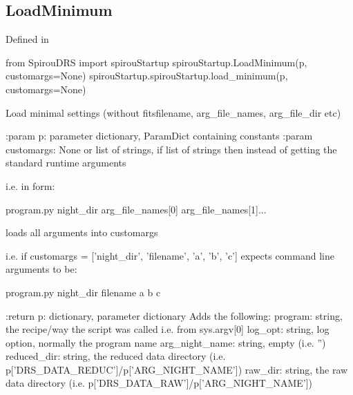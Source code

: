 \noindent\begin{minipage}{\textwidth}
\subsection{LoadMinimum}

Defined in \spirouStartup{}

\begin{pythonbox}
from SpirouDRS import spirouStartup
spirouStartup.LoadMinimum(p, customargs=None)
spirouStartup.spirouStartup.load_minimum(p, customargs=None)
\end{pythonbox}

\begin{pythondocstring}
Load minimal settings (without fitsfilename, arg_file_names, arg_file_dir
etc)

:param p: parameter dictionary, ParamDict containing constants
:param customargs: None or list of strings, if list of strings then instead
                   of getting the standard runtime arguments

       i.e. in form:

            program.py night_dir arg_file_names[0] arg_file_names[1]...

       loads all arguments into customargs

       i.e. if customargs = ['night_dir', 'filename', 'a', 'b', 'c']
       expects command line arguments to be:

            program.py night_dir filename a b c

:return p: dictionary, parameter dictionary
        Adds the following:
            program: string, the recipe/way the script was called
                     i.e. from sys.argv[0]
            log_opt: string, log option, normally the program name
            arg_night_name: string, empty (i.e. '')
            reduced_dir: string, the reduced data directory
                         (i.e. p['DRS_DATA_REDUC']/p['ARG_NIGHT_NAME'])
            raw_dir: string, the raw data directory
                     (i.e. p['DRS_DATA_RAW']/p['ARG_NIGHT_NAME'])
\end{pythondocstring}
\end{minipage}


